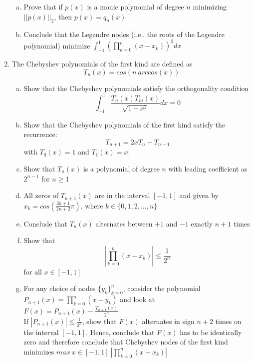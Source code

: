 \documentclass{article}
\begin{document}
\begin{enumerate}
\begin{enumerate}[(a)]
\item Prove that if $p(x)$ is a monic polynomial of degree $n$ minimizing $||p(x)||_{2}$, then $p(x) = q_{n}(x)$
\item Conclude that the Legendre nodes (i.e., the roots of the Legendre polynomial) minimize $\displaystyle \int_{-1}^{1} \left( \prod_{k=0}^{n} (x-x_{k}) \right)^{2} dx$
\end{enumerate}

\item The Chebyshev polynomials of the first kind are defined as
    $$T_{n}(x) = cos(n \ arccos(x))$$

\begin{enumerate}[(a)]
\item Show that the Chebyshev polynomials satisfy the orthogonality condition
    $$\displaystyle \int_{-1}^{1} \frac{T_{n}(x) T_{m}(x)}{\sqrt{1 - x^{2}}} dx = 0$$

\item Show that the Chebyshev polynomials of the first kind satisfy the recurrence:
    $$T_{n+1} = 2xT_{n} - T_{n-1}$$
with $T_{0}(x) = 1$ and $T_{1}(x) = x$.

\item Show that $T_{n}(x)$ is a polynomial of degree $n$ with leading coefficient as $2^{n-1}$ for $n \geq 1$

\item All zeros of $T_{n+1}(x)$ are in the interval $[-1, 1]$ and given by $x_{k} = cos \left( \displaystyle \frac{2k+1}{2n+2} \pi \right)$, where $k \in \{0,1,2,...,n\}$

\item Conclude that $T_{n}(x)$ alternates between $+1$ and $-1$ exactly $n+1$ times
\item Show that
    $$\displaystyle \left| \prod_{k=0}^{n} (x - x_{k}) \right| \leq \frac{1}{2^{n}}$$
for all $x \in [-1, 1]$


\item For any choice of nodes $\{y_{k}\}_{k=0}^{n}$, consider the polynomial $P_{n+1}(x) = \displaystyle \prod_{k=0}^{n} (x - y_{k})$ and look at $F(x) = P_{n+1}(x) -
    \displaystyle \frac{T_{n+1}(x)}{2^{n}}$ \\

If $\displaystyle |P_{n+1}(x)| \leq  \frac{1}{2^{n}}$, show that $F(x)$ alternates in sign $n+2$ times on the interval $[-1, 1]$. Hence, conclude that $F(x)$ has to be identically zero and 
therefore conclude that Chebyshev nodes of the first kind minimizes $max \ x \in [-1, 1] \  \left| \displaystyle \prod_{k=0}^{n} (x - x_{k}) \right|$
\end{enumerate}


\end{enumerate}
\end{document}
